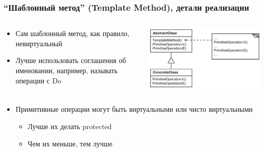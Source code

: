\documentclass[xetex,mathserif,serif]{beamer}
\begin{document}
	\begin{frame}
		\frametitle{``Шаблонный метод'' (Template Method), детали реализации}
		\begin{columns}
			\begin{column}{0.5\textwidth}
				\begin{itemize}
					\item Сам шаблонный метод, как правило, невиртуальный
					\item Лучше использовать соглашения об именовании, например, называть операции с Do
				\end{itemize}
			\end{column}
			\begin{column}{0.4\textwidth}
				\begin{center}
					\includegraphics[width=\textwidth]{templateMethod.png}
				\end{center}
			\end{column}
		\end{columns}
		\begin{itemize}
			\item Примитивные операции могут быть виртуальными или чисто виртуальными
			\begin{itemize}
				\item Лучше их делать protected
				\item Чем их меньше, тем лучше
			\end{itemize}
		\end{itemize}
	\end{frame}
\end{document}
